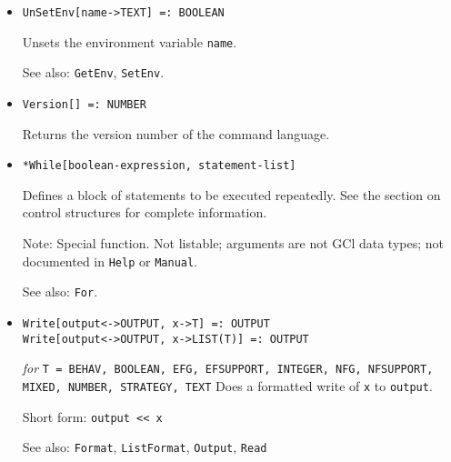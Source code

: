 \begin{itemize}
\item{}
\protect \large \begin{verbatim}
UnSetEnv[name->TEXT] =: BOOLEAN 
\end{verbatim} \normalsize

\bd
Unsets the environment variable \verb+name+.
\item [See also:] \verb+GetEnv+, \verb+SetEnv+.
\ed


\item{}
\protect \large \begin{verbatim}
Version[] =: NUMBER 
\end{verbatim} \normalsize

\bd
Returns the version number of the command language.
\ed



\item{} 
\protect \large \begin{verbatim}
*While[boolean-expression, statement-list]
\end{verbatim} \normalsize
  
\bd
Defines a block of statements to be executed repeatedly.
See the section on control structures for complete information.
\item [Note:] Special function.  Not listable; arguments are not GCl
data types; not documented in \verb+Help+ or \verb+Manual+.  
\item
[See also:] \verb+For+.
\ed

\item{}
\protect \large \begin{verbatim}
Write[output<->OUTPUT, x->T] =: OUTPUT  
Write[output<->OUTPUT, x->LIST(T)] =: OUTPUT
\end{verbatim}\normalsize

{\it for} {\tt T = BEHAV, BOOLEAN, EFG, EFSUPPORT, INTEGER,
NFG, NFSUPPORT, MIXED, NUMBER, STRATEGY, TEXT}
\bd
Does a formatted write of \verb+x+ to \verb+output+.
\item [Short form:] \verb+output << x+
\item [See also:] \verb+Format+, \verb+ListFormat+, \verb+Output+, \verb+Read+
\ed




\end{itemize}

